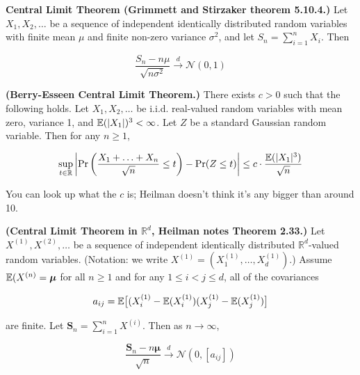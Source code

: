 \begin{theorem} \label{asym.clt} \textbf{Central Limit Theorem (Grimmett and Stirzaker theorem 5.10.4.)} Let \(X_1, X_2, \ldots\) be a sequence of independent identically distributed random variables with finite mean \(\mu\) and finite non-zero variance \(\sigma^2\), and let \(S_n = \sum_{i=1}^n X_i\). Then

\[
\frac{S_n - n \mu}{\sqrt{n \sigma^2}} \xrightarrow{d} \mathcal{N}(0,1)
\]
\end{theorem}

\begin{theorem}\label{asym.berry.esseen} \textbf{(Berry-Esseen Central Limit Theorem.)} There exists \(c > 0\) such that the following holds. Let \(X_1, X_2, \ldots\) be i.i.d. real-valued random variables with mean zero, variance 1, and \(\mathbb{E}(|X_1|)^3 < \infty\). Let \(Z\) be a standard Gaussian random variable. Then for any \(n \geq 1\), 

\[
\sup_{t \in \mathbb{R}} \left| \Pr\bigg( \frac{X_1 + \ldots + X_n}{\sqrt{n}} \leq t \bigg) - \Pr( Z \leq t) \right| \leq c \cdot \frac{\mathbb{E}(|X_1|^3) }{\sqrt{n}}
\]

\end{theorem}

\begin{remark}You can look up what the \(c\) is; Heilman doesn't think it's any bigger than around 10.

\end{remark}

\begin{theorem} \label{asym.clt.vector} \textbf{(Central Limit Theorem in \(\mathbb{R}^d\), Heilman notes Theorem 2.33.)} Let \(X^{(1)}, X^{(2)}, \ldots\) be a sequence of independent identically distributed \(\mathbb{R}^d\)-valued random variables. (Notation: we write \(X^{(1)} = (X^{(1)}_1, \ldots, X^{(1)}_d)\).) Assume \(\mathbb{E}(X^{(n)} = \boldsymbol{\mu}\) for all \(n \geq 1\) and for any \(1 \leq i < j \leq d\), all of the covariances

\[
a_{ij} = \mathbb{E}\big[(X_i^{(1)} - \mathbb{E}(X_i^{(1)})(X_j^{(1)} - \mathbb{E}(X_j^{(1)}) \big]
\]

are finite. Let \(\boldsymbol{S}_n = \sum_{i=1}^n X^{(i)}\). Then as \(n \to \infty\), 

\[
\frac{\boldsymbol{S}_n - n \boldsymbol{\mu}}{\sqrt{n }} \xrightarrow{d} \mathcal{N}(0,[a_{ij}])
\]
\end{theorem}

